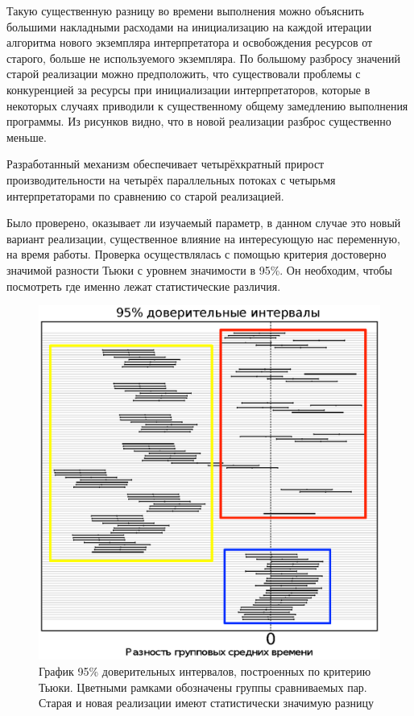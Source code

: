 Такую существенную разницу во времени выполнения
можно объяснить большими накладными расходами
на инициализацию на каждой итерации алгоритма
нового экземпляра интерпретатора
и освобождения ресурсов от старого,
больше не используемого экземпляра.
По большому разбросу значений
старой реализации можно предположить,
что существовали проблемы с конкуренцией
за ресурсы при инициализации интерпретаторов,
которые в некоторых случаях приводили к
существенному общему замедлению выполнения программы.
Из рисунков видно,
что в новой реализации разброс существенно меньше.

Разработанный механизм обеспечивает
четырёхкратный прирост производительности
на четырёх параллельных потоках
с четырьмя интерпретаторами по
сравнению со старой реализацией.

Было проверено, оказывает ли изучаемый параметр,
в данном случае это новый вариант реализации,
существенное влияние на интересующую нас
переменную, на время работы.
Проверка осуществлялась с помощью
критерия достоверно значимой
разности Тьюки
с уровнем значимости в 95\%.
Он необходим, чтобы посмотреть
где именно лежат статистические различия.

\begin{figure}[!h]
\centering
\includegraphics[width=\textwidth]{tukey}
\caption{График 95\% доверительных интервалов,
построенных по критерию Тьюки.
Цветными рамками обозначены группы сравниваемых пар.
Старая и новая реализации имеют статистически
значимую разницу}
\label{fig:tukey}
\end{figure}

